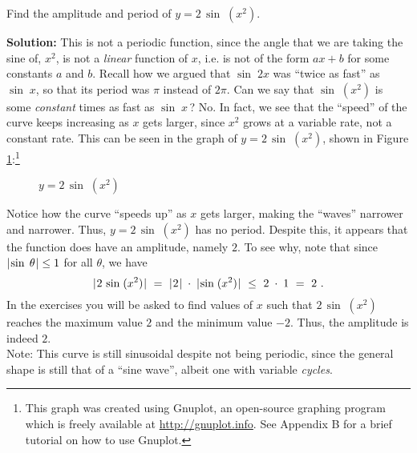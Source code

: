\divider\vspace{-2mm}
\newpage
\begin{exmp}\label{exmp:2sinx2}
 Find the amplitude and period of $y=2\,\sin\;( x^2 )$.\vspace{1mm}
 \par\noindent\textbf{Solution:} This is not a periodic function, since the angle that we are taking
 the sine of, $x^2$, is not a \emph{linear} function of $x$, i.e. is not of the form $ax+b$ for some
 constants $a$ and $b$. Recall how we argued that $\sin\;2x$ was ``twice as fast'' as $\sin\;x$, so
 that its period was $\pi$ instead of $2\pi$. Can we say that $\sin\;( x^2 )$ is some
 \emph{constant}
 times as fast as $\sin\;x\,$? No. In fact, we see that the ``speed'' of the curve keeps increasing
 as $x$ gets larger, since $x^2$ grows at a variable rate, not a constant rate. This can be seen in
 the graph of $y=2\,\sin\;( x^2 )$, shown in Figure \ref{fig:exmp2sinx2}:\footnote{This graph was
 created using Gnuplot, an open-source graphing program which is freely available at
 \url{http://gnuplot.info}. See Appendix B for a brief tutorial on how to use Gnuplot.}\vspace{-1mm}
 
\begin{figure}[h]
 \begin{center}
   \vspace{-6mm}
 \end{center}
 \caption[]{\quad $y=2\,\sin\;( x^2 )$}
 \label{fig:exmp2sinx2}
\end{figure}

 Notice how the curve ``speeds up'' as $x$ gets larger, making the ``waves'' narrower and narrower.
 Thus, $y=2\,\sin\;( x^2 )$ has no period. Despite this, it appears that the function does have an
 amplitude, namely $2$. To see why, note that since $\lvert\mspace{1mu}\sin\;\theta\mspace{1mu}\rvert \le 1$ for all $\theta$, we
 have
 \begin{displaymath}
  \lvert\mspace{1mu}2\,\sin\;( x^2 )\mspace{1mu}\rvert ~=~ \lvert\mspace{1mu}2\mspace{1mu}\rvert \;\cdot\; \lvert\mspace{1mu}\sin\;( x^2 )\mspace{1mu}\rvert ~\le~ 2 \;\cdot\; 1 ~=~ 2 ~.
 \end{displaymath}
 In the exercises you will be asked to find values of $x$ such that $2\,\sin\;( x^2 )$ reaches the
 maximum value $2$ and the minimum value $-2$. Thus, the amplitude is indeed $2$.\\Note: This curve
 is still sinusoidal despite not being periodic, since the general shape is still that of a ``sine
 wave'', albeit one with variable \emph{cycles}.
\end{exmp}\vspace{-3mm}
\divider
\vspace{1mm}

